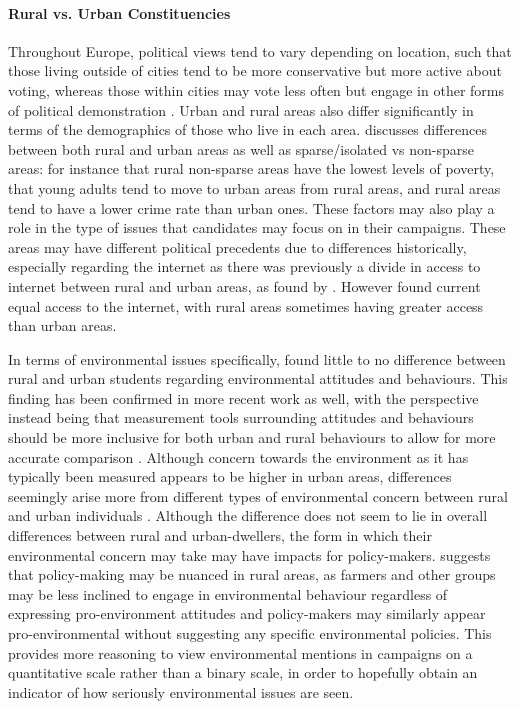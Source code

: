 \documentclass[12pt,letterpaper]{article}
\begin{document}
\paragraph{Rural vs. Urban Constituencies}

Throughout Europe, political views tend to vary depending on location, such that those living outside of cities tend to be more conservative but more active about voting, whereas those within cities may vote less often but engage in other forms of political demonstration \autocite{kennyUrbanruralPolarisationPolitical2021}. Urban and rural areas also differ significantly in terms of the demographics of those who live in each area. \textcite{patemanRuralUrbanAreas2011} discusses differences between both rural and urban areas as well as sparse/isolated vs non-sparse areas: for instance that rural non-sparse areas have the lowest levels of poverty, that young adults tend to move to urban areas from rural areas, and rural areas tend to have a lower crime rate than urban ones. These factors may also play a role in the type of issues that candidates may focus on in their campaigns. These areas may have different political precedents due to differences historically, especially regarding the internet as there was previously a divide in access to internet between rural and urban areas, as found by \textcite{choudrieRealisingGovernmentUK2005}. However \textcite{patemanRuralUrbanAreas2011} found current equal access to the internet, with rural areas sometimes having greater access than urban areas.

In terms of environmental issues specifically, \textcite{bognerEnvironmentalPerceptionRural1997} found little to no difference between rural and urban students regarding environmental attitudes and behaviours. This finding has been confirmed in more recent work as well, with the perspective instead being that measurement tools surrounding attitudes and behaviours should be more inclusive for both urban and rural behaviours to allow for more accurate comparison \autocite{huddart-kennedyRuralUrbanDifferencesEnvironmental2009}. Although concern towards the environment as it has typically been measured appears to be higher in urban areas, differences seemingly arise more from different types of environmental concern between rural and urban individuals \autocite{deberenguerRuralUrbanDifferencesEnvironmental2005}. Although the difference does not seem to lie in overall differences between rural and urban-dwellers, the form in which their environmental concern may take may have impacts for policy-makers. \textcite{freudenburgRuralUrbanDifferencesEnvironmental1991} suggests that policy-making may be nuanced in rural areas, as farmers and other groups may be less inclined to engage in environmental behaviour regardless of expressing pro-environment attitudes and policy-makers may similarly appear pro-environmental without suggesting any specific environmental policies. This provides more reasoning to view environmental mentions in campaigns on a quantitative scale rather than a binary scale, in order to hopefully obtain an indicator of how seriously environmental issues are seen.
\end{document}
